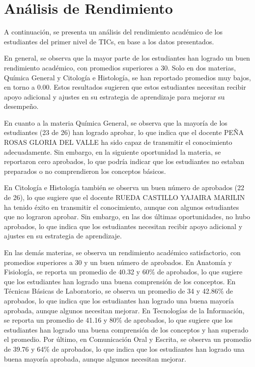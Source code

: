 \vspace{1cm}
\section{Análisis de Rendimiento}
A continuación, se presenta un análisis del rendimiento académico de los estudiantes del primer nivel de TICs, en base a los datos presentados.

En general, se observa que la mayor parte de los estudiantes han logrado un buen rendimiento académico, con promedios superiores a 30. Solo en dos materias, Química General y Citología e Histología, se han reportado promedios muy bajos, en torno a 0.00. Estos resultados sugieren que estos estudiantes necesitan recibir apoyo adicional y ajustes en su estrategia de aprendizaje para mejorar su desempeño.

En cuanto a la materia Química General, se observa que la mayoría de los estudiantes (23 de 26) han logrado aprobar, lo que indica que el docente PEÑA ROSAS GLORIA DEL VALLE ha sido capaz de transmitir el conocimiento adecuadamente. Sin embargo, en la siguiente oportunidad la materia, se reportaron cero aprobados, lo que podría indicar que los estudiantes no estaban preparados o no comprendieron los conceptos básicos.

En Citología e Histología también se observa un buen número de aprobados (22 de 26), lo que sugiere que el docente RUEDA CASTILLO YAJAIRA MARILIN ha tenido éxito en transmitir el conocimiento, aunque con algunos estudiantes que no lograron aprobar. Sin embargo, en las dos últimas oportunidades, no hubo aprobados, lo que indica que los estudiantes necesitan recibir apoyo adicional y ajustes en su estrategia de aprendizaje.

En las demás materias, se observa un rendimiento académico satisfactorio, con promedios superiores a 30 y un buen número de aprobados. En Anatomía y Fisiología, se reporta un promedio de 40.32 y 60\% de aprobados, lo que sugiere que los estudiantes han logrado una buena comprensión de los conceptos. En Técnicas Básicas de Laboratorio, se observa un promedio de 34 y 42.86\% de aprobados, lo que indica que los estudiantes han logrado una buena mayoría aprobada, aunque algunos necesitan mejorar. En Tecnologías de la Información, se reporta un promedio de 41.16 y 80\% de aprobados, lo que sugiere que los estudiantes han logrado una buena comprensión de los conceptos y han superado el promedio. Por último, en Comunicación Oral y Escrita, se observa un promedio de 39.76 y 64\% de aprobados, lo que indica que los estudiantes han logrado una buena mayoría aprobada, aunque algunos necesitan mejorar.

